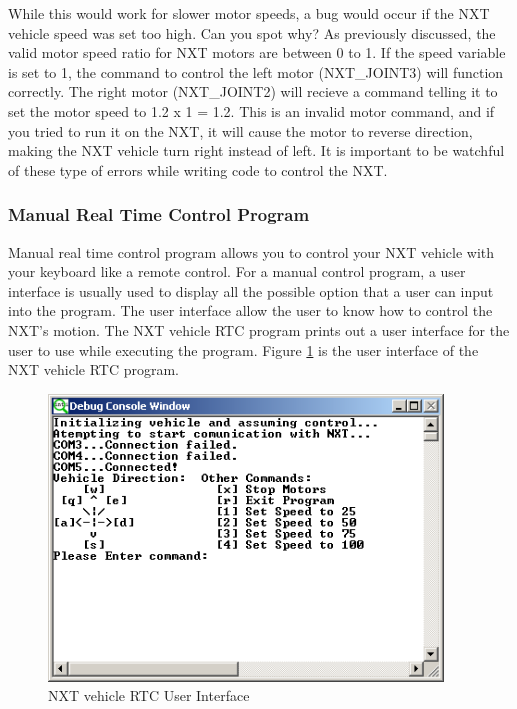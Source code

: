 \documentclass[11pt]{article}
\begin{document}
\noindent
While this would work for slower motor speeds, a bug would occur if the NXT vehicle speed was 
set too high. Can you spot why? As previously discussed, the valid motor speed ratio for NXT 
motors are between 0 to 1. If the speed variable is set to 1, the command to control 
the left motor (NXT\_JOINT3) will function correctly. The right motor (NXT\_JOINT2) will 
recieve a command telling it to set the motor speed to 1.2 x 1 = 1.2. This is an invalid motor 
command, and if you tried to run it on the NXT, it will cause the motor to reverse direction, 
making the NXT vehicle turn right instead of left. It is important to be watchful of these 
type of errors while writing code to control the NXT.\\

\subsubsection{Manual Real Time Control Program}
Manual real time control program allows you to control your NXT vehicle with your keyboard like a 
remote control. For a manual control program, a user interface is usually used to display all the 
possible option that a user can input into the program. The user interface allow the user to know how
to control the NXT's motion. The NXT vehicle RTC program prints out a user interface for the user to 
use while executing the program. Figure \ref{fig_NXT_GUI} is the user interface of the NXT vehicle 
RTC program.\\
\begin{figure}[h]
  \begin{center}
    \includegraphics[height=3in]{figure/mindstorm/RTC_GUI.png}
    \caption{NXT vehicle RTC User Interface \label{fig_NXT_GUI}}
  \end{center}
\end{figure}
\end{document}
